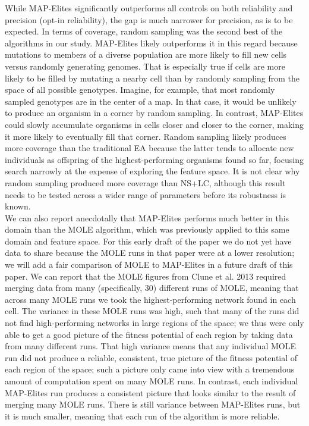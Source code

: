 \documentclass[twocolumn, DIV25, 9pt]{scrartcl}
\begin{document}
While MAP-Elites significantly outperforms all controls on both reliability and precision (opt-in reliability), the gap is much narrower for precision, as is to be expected. 
In terms of coverage, random sampling was the second best of the algorithms in our study. MAP-Elites likely outperforms it in this regard because mutations to members of a diverse population are more likely to fill new cells versus randomly generating genomes. That is especially true if cells are more likely to be filled by mutating a nearby cell than by randomly sampling from the space of all possible genotypes. Imagine, for example, that most randomly sampled genotypes are in the center of a map. In that case, it would be unlikely to produce an organism in a corner by random sampling. In contrast, MAP-Elites could slowly accumulate organisms in cells closer and closer to the corner, making it more likely to eventually fill that corner. Random sampling likely produces more coverage than the traditional EA because the latter tends to allocate new individuals as offspring of the highest-performing organisms found so far, focusing search narrowly at the expense of exploring the feature space. It is not clear why random sampling produced more coverage than NS+LC, although this result needs to be tested across a wider range of parameters before its robustness is known. 
%
%
\\
\indent We can also report anecdotally that MAP-Elites performs much better in this domain than the MOLE algorithm, which was previously applied to this same domain and feature space\cite{clune2013originModularity}. For this early draft of the paper we do not yet have data to share because the MOLE runs in that paper were at a lower resolution; we will add a fair comparison of MOLE to MAP-Elites in a future draft of this paper. We can report that the MOLE figures from Clune et al. 2013 required merging data from many (specifically, 30) different runs of MOLE, meaning that across many MOLE runs we took the highest-performing network found in each cell. The variance in these MOLE runs was high, such that many of the runs did not find high-performing networks in large regions of the space; we thus were only able to get a good picture of the fitness potential of each region by taking data from many different runs. That high variance means that any individual MOLE run did not produce a reliable, consistent, true picture of the fitness potential of each region of the space; such a picture only came into view with a tremendous amount of computation spent on many MOLE runs. In contrast, each individual MAP-Elites run produces a consistent picture that looks similar to the result of merging many MOLE runs. There is still variance between MAP-Elites runs, but it is much smaller, meaning that each run of the algorithm is more reliable. 
\end{document}
